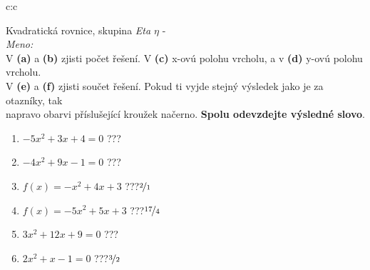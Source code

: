 \documentclass[10pt]{report}
\begin{document}
\clearpage
\thispagestyle{empty}
\begin{tabular}{c:c}
\begin{minipage}[c][99mm][t]{0.49\linewidth}
\begin{center}
\vspace{7mm}
{\huge Kvadratická rovnice, skupina \textit{Eta $\eta$} -}\\[4.5mm]
\textit{Meno:}\phantom{xxxxxxxxxxxxxxxxxxxxxxxxxxxxxxxxxxxxxxxxxxxxxxxxxxxxxxxxxxxxxxxxx}\\[3.5mm]
V \textbf{(a)} a \textbf{(b)} zjisti počet řešení. V \textbf{(c)} x-ovú polohu vrcholu, a v \textbf{(d)} y-ovú polohu vrcholu.\\V \textbf{(e)} a \textbf{(f)} zjisti součet řešení. Pokud ti vyjde stejný výsledek jako je za otazníky, tak\\napravo obarvi příslušející kroužek načerno. \textbf{Spolu odevzdejte výsledné slovo}.\\[3mm]
\begin{minipage}{0.77\linewidth}
\begin{center}
\begin{varwidth}{\textwidth}
\begin{enumerate}
\large
\item $-5x^2+3x+4=0$\quad \dotfill\; ???\;\dotfill {}
\item $-4x^2+9x-1=0$\quad \dotfill\; ???\;\dotfill {}
\item $f(x)=-x^2+4x+3$\quad \dotfill\; ???\;\dotfill \quad $\nicefrac{2}{1}$
\item $f(x)=-5x^2+5x+3$\quad \dotfill\; ???\;\dotfill \quad $\nicefrac{17}{4}$
\item $3x^2+12x+9=0$\quad \dotfill\; ???\;\dotfill {}
\item $2x^2+x-1=0$\quad \dotfill\; ???\;\dotfill \quad $\nicefrac{3}{2}$
\end{enumerate}
\end{varwidth}
\end{center}
\end{minipage}

\end{center}
\end{minipage}
\end{tabular}
\end{document}
